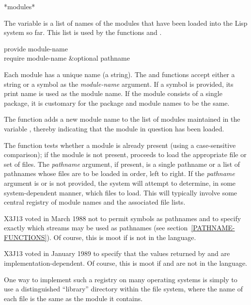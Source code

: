\begin{defun}[Variable]
*modules*

The variable  is a list of names of the modules
that have been loaded into the Lisp system so far.
This list is used by the functions  and .
\end{defun}

\begin{defun}[Function]
provide module-name \\
require module-name &optional pathname

Each module has a unique name (a string).  The  and 
functions accept either a string or a symbol as the \emph{module-name}
argument.  If a symbol is provided, its print name is used as the module
name.  If the module consists of a single package, it is customary for
the package and module names to be the same.

The 
function adds a new module name to the list of modules
maintained in the variable , thereby indicating that
the module in question has been loaded.

The  function tests whether a module is already present
(using a case-sensitive comparison); if the module is not present,
 proceeds to load the appropriate
file or set of files.  The \emph{pathname} argument, if present, is a single
pathname or a list of pathnames whose files are to be loaded in order,
left to right.  If the \emph{pathname} argument is {\false} or is not provided,
the system will attempt to determine, in some
system-dependent manner, which files to load.
This will typically involve some central
registry of module names and the associated file lists.

\begin{new}
X3J13 voted in March 1988
not to permit symbols as pathnames
 and
to specify exactly which streams may be used as pathnames
 (see section~\ref{PATHNAME-FUNCTIONS}).
Of course, this is moot if  is not in the language.
\end{new}

\begin{new}
X3J13 voted in January 1989
to specify that the values returned by  and 
are implementation-dependent.  Of course, this is moot
if  and  are not in the language.
\end{new}


\beforenoterule
\begin{implementation}
One way to implement such a registry on
many operating systems is simply to use a distinguished ``library''
directory within the file system, where the name of each file
is the same as the module it contains.
\end{implementation}
\afternoterule
\end{defun}

